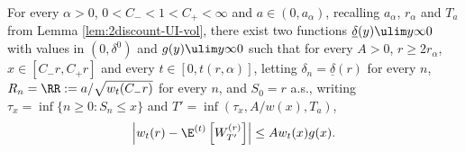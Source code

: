 \documentclass[10pt,a4paper]{article}
\begin{document}
\begin{corollary}\label{cor:2Feynman-Kac-vol}
For every $\alpha>0$, $0<C_-<1<C_+<\infty$ and $a\in (0,a_\alpha)$, recalling $a_\alpha$, $r_\alpha$ and $T_a$ from Lemma \ref{lem:2discount-UI-vol}, 
there exist two functions $\underline{\delta}(y)\ulim y \infty 0$ with values in $(0,\delta^0)$ and $g(y) \ulim y \infty 0$ such that 
for every $A>0$, $r\geq 2r_\alpha$, $x \in [C_- r, C_+ r]$ and every $t\in[0,t(r,\alpha)] $, letting $\delta_n = \underline{\delta}(r)$ for every $n$, $R_n = \RR := a/\sqrt{w_t(C_- r)}$ for every $n$, and $S_0 = r$ a.s., 
writing $\tau_x = \inf\{ n\geq 0 : S_n \leq x \}$ and $T' = \inf(\tau_x, A/w(x), T_a)$, 
\begin{equation}\label{eq:2FK-vol}
\left| w_t(r) - \E^{(t)}\left[ W^{(r)}_{T'}\right] \right| \leq A w_t(x) g(x) . 
\end{equation}
\end{corollary}


\end{document}
